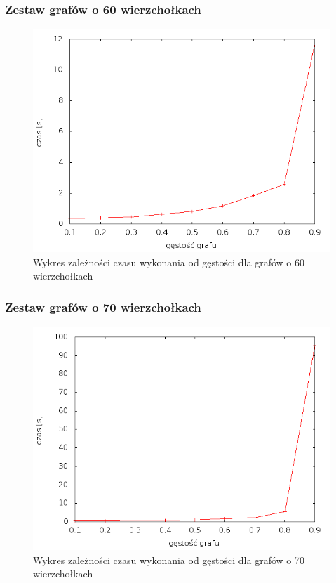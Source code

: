 \documentclass[12pt, a4paper]{article}
\begin{document}
\subsubsection*{Zestaw grafów o 60 wierzchołkach}
\begin{figure}[!h]
    \begin{center}
	\includegraphics[scale=0.5]{results/img/dim/dim_60.png}
	\caption{Wykres zależności czasu wykonania od gęstości dla grafów o 60 wierzchołkach}
    \end{center}
\end{figure}
\FloatBarrier
\newpage
\subsubsection*{Zestaw grafów o 70 wierzchołkach}
\begin{figure}[!h]
    \begin{center}
	\includegraphics[scale=0.5]{results//img/dim/dim_70.png}
	\caption{Wykres zależności czasu wykonania od gęstości dla grafów o 70 wierzchołkach}
    \end{center}
\end{figure}
\FloatBarrier
\end{document}
